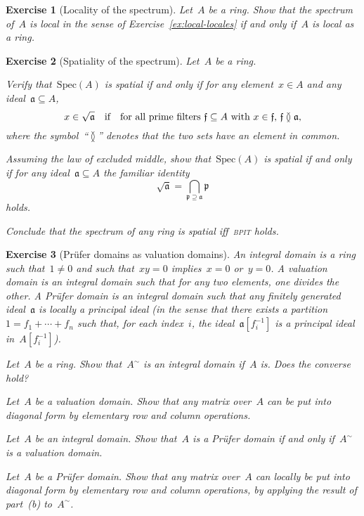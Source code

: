 \documentclass{ws-rv9x6}
\newtheorem{ex}{Exercise}
\newenvironment{exercise}[1]{
  \begin{ex}[#1]
}{\end{ex}}
\newcommand{\aaa}{\mathfrak{a}}
\newcommand{\ppp}{\mathfrak{p}}
\newcommand{\fff}{\mathfrak{f}}
\newcommand{\Spec}{\mathrm{Spec}}
\renewcommand{\_}{\mathpunct{.}}
\newcommand{\?}{\,{:}\,}
\newcommand{\BPIT}{\textsc{bpit}\xspace}
\begin{document}
\begin{exercise}{Locality of the spectrum}%
Let~$A$ be a ring. Show that the spectrum of~$A$ is local in the sense of
Exercise~\ref{ex:local-locales} if and only if~$A$ is local as a ring.
\end{exercise}

\begin{exercise}{Spatiality of the spectrum}%
Let~$A$ be a ring.
\begin{alphlist}[(c)]
\item Verify that~$\Spec(A)$ is spatial if and only if for any element~$x \in
A$ and any ideal~$\aaa \subseteq A$,
\[ x \in \sqrt{\aaa} \quad\textnormal{if}\quad
\text{for all prime filters~$\fff \subseteq A$ with~$x \in \fff$, $\fff \between \aaa$}, \]
where the symbol~``$\between$'' denotes that the two sets have an element in common.
\item Assuming the law of excluded middle, show that~$\Spec(A)$ is spatial if
and only if for any ideal~$\aaa \subseteq A$ the familiar identity
\[ \sqrt{\aaa} = \bigcap_{\ppp \supseteq \aaa} \ppp \]
holds.
\item Conclude that the spectrum of any ring is spatial iff~\BPIT holds.
\end{alphlist}
\end{exercise}

\begin{exercise}{Prüfer domains as valuation domains}%
An \emph{integral domain} is a ring such that~$1 \neq 0$ and such that~$xy = 0$
implies~$x = 0$ or~$y = 0$. A \emph{valuation domain} is an integral domain
such that for any two elements, one divides the other. A \emph{Prüfer domain}
is an integral domain such that any finitely generated ideal~$\aaa$ is locally a
principal ideal (in the sense that there exists a partition~$1 = f_1 + \cdots +
f_n$ such that, for each index~$i$, the ideal~$\aaa[f_i^{-1}]$ is a principal
ideal in~$A[f_i^{-1}]$).
\begin{alphlist}[(d)]
\item Let~$A$ be a ring. Show that~$A^\sim$ is an integral domain if~$A$ is.
Does the converse hold?
\item Let~$A$ be a valuation domain. Show that any matrix over~$A$ can be put
into diagonal form by elementary row and column operations.
\item Let~$A$ be an integral domain. Show that~$A$ is a Prüfer domain if and
only if~$A^\sim$ is a valuation domain.
\item Let~$A$ be a Prüfer domain. Show that any matrix over~$A$ can locally be
put into diagonal form by elementary row and column operations, by applying the
result of part~(b) to~$A^\sim$.
\end{alphlist}
\end{exercise}
\end{document}
